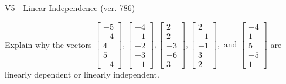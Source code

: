 \begin{exercise}
  \begin{exerciseTitle}V5 - Linear Independence (ver. 786)\end{exerciseTitle}
  \begin{exerciseStatement}
    Explain why the vectors \(\left[\begin{array}{r}
-5 \\
-4 \\
4 \\
5 \\
-4
\end{array}\right] , \left[\begin{array}{r}
-4 \\
-1 \\
-2 \\
-3 \\
-1
\end{array}\right] , \left[\begin{array}{r}
2 \\
2 \\
-3 \\
-6 \\
3
\end{array}\right] , \left[\begin{array}{r}
2 \\
-1 \\
-1 \\
3 \\
2
\end{array}\right] , \text{ and } \left[\begin{array}{r}
-4 \\
1 \\
5 \\
-5 \\
1
\end{array}\right]\) are linearly dependent or linearly independent.	



\end{exerciseStatement}
\end{exercise}
